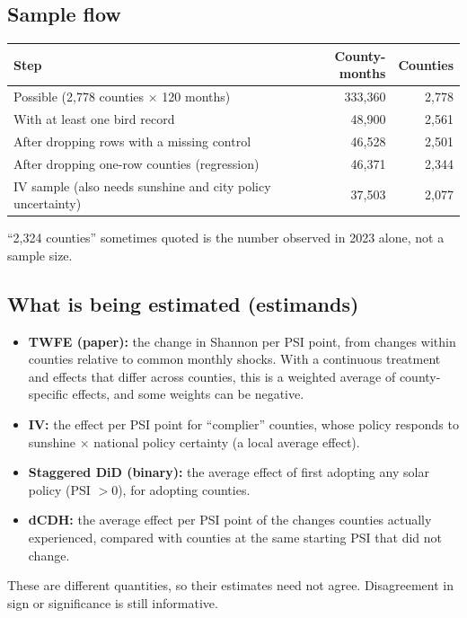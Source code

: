 \documentclass[11pt]{article}
\begin{document}
\subsection{Sample flow}
\begin{center}\small
\begin{tabular}{lrr}
\toprule
Step & County-months & Counties \\
\midrule
Possible (2,778 counties $\times$ 120 months) & 333,360 & 2,778 \\
With at least one bird record & 48,900 & 2,561 \\
After dropping rows with a missing control & 46,528 & 2,501 \\
After dropping one-row counties (regression) & 46,371 & 2,344 \\
IV sample (also needs sunshine and city policy uncertainty) & 37,503 & 2,077 \\
\bottomrule
\end{tabular}
\end{center}
``2,324 counties'' sometimes quoted is the number observed in 2023 alone, not a sample size.

\subsection{What is being estimated (estimands)}
\begin{itemize}[leftmargin=14pt,itemsep=2pt]
\item \textbf{TWFE (paper):} the change in Shannon per PSI point, from changes within counties relative to common monthly shocks. With a continuous treatment and effects that differ across counties, this is a weighted average of county-specific effects, and some weights can be negative.
\item \textbf{IV:} the effect per PSI point for ``complier'' counties, whose policy responds to sunshine $\times$ national policy certainty (a local average effect).
\item \textbf{Staggered DiD (binary):} the average effect of first adopting any solar policy (PSI $>0$), for adopting counties.
\item \textbf{dCDH:} the average effect per PSI point of the changes counties actually experienced, compared with counties at the same starting PSI that did not change.
\end{itemize}
These are different quantities, so their estimates need not agree. Disagreement in sign or significance is still informative.
\end{document}
